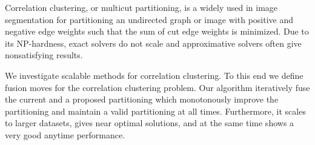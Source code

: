 Correlation clustering, or multicut partitioning,
is a widely used in image segmentation for
partitioning an undirected graph or image with positive and negative edge weights 
such that the sum of cut edge weights is minimized.
%
Due to its NP-hardness, exact solvers do not scale and approximative solvers often give nonsatisfying results.

We investigate scalable methods for correlation clustering.
To this end we define fusion moves for the correlation clustering problem.
Our algorithm iteratively fuse the current and a proposed partitioning which  monotonously improve
the partitioning and maintain a valid partitioning at all times.
Furthermore, it scales to larger datasets, gives near optimal solutions, and at the same time shows
a very good anytime performance.

